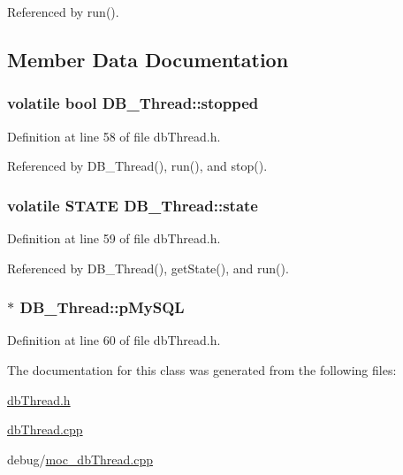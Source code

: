 Referenced by run().

\subsection{Member Data Documentation}
\hypertarget{class_d_b___thread_31c37537c9902c0ebf175b2a35ec965f}{
\subsubsection[stopped]{\setlength{\rightskip}{0pt plus 5cm}volatile bool {\bf DB\_\-Thread::stopped}}}
\label{class_d_b___thread_31c37537c9902c0ebf175b2a35ec965f}




Definition at line 58 of file dbThread.h.

Referenced by DB\_\-Thread(), run(), and stop().\hypertarget{class_d_b___thread_9b38f026919bb5a09dd2e8af8e0feef7}{
\subsubsection[state]{\setlength{\rightskip}{0pt plus 5cm}volatile {\bf STATE} {\bf DB\_\-Thread::state}}}
\label{class_d_b___thread_9b38f026919bb5a09dd2e8af8e0feef7}




Definition at line 59 of file dbThread.h.

Referenced by DB\_\-Thread(), getState(), and run().\hypertarget{class_d_b___thread_e4deb0ec2f72fb944aabb8015b678954}{
\subsubsection[pMySQL]{$\ast$ {\bf DB\_\-Thread::pMySQL}}}
\label{class_d_b___thread_e4deb0ec2f72fb944aabb8015b678954}




Definition at line 60 of file dbThread.h.

The documentation for this class was generated from the following files:\begin{CompactItemize}
\item 
\hyperlink{db_thread_8h}{dbThread.h}\item 
\hyperlink{db_thread_8cpp}{dbThread.cpp}\item 
debug/\hyperlink{moc__db_thread_8cpp}{moc\_\-dbThread.cpp}\end{CompactItemize}
